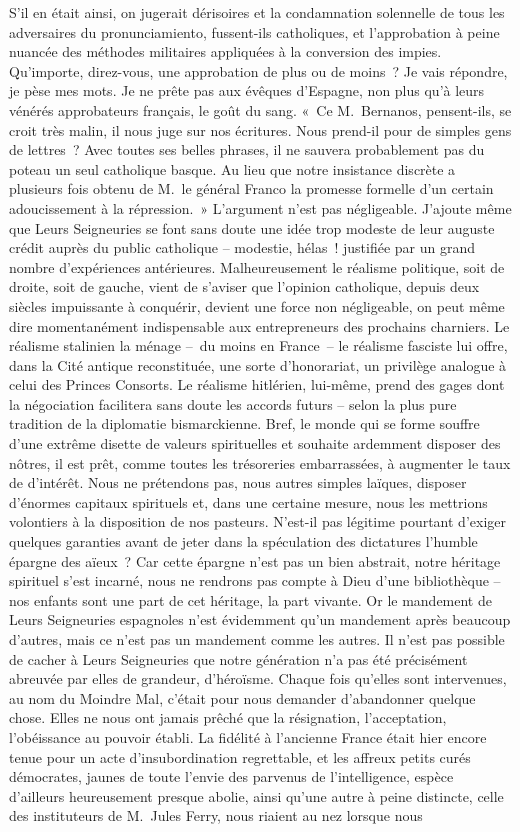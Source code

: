 \documentclass[french,twoside]{book} %
\begin{document}
S’il en était ainsi, on jugerait dérisoires et la condamnation solennelle de tous les adversaires du pronunciamiento, fussent-ils catholiques, et l’approbation à peine nuancée des méthodes militaires appliquées à la conversion des impies. Qu’importe, direz-vous, une approbation de plus ou de moins ? Je vais répondre, je pèse mes mots. Je ne prête pas aux évêques d’Espagne, non plus qu’à leurs vénérés approbateurs français, le goût du sang. « Ce M. Bernanos, pensent-ils, se croit très malin, il nous juge sur nos écritures. Nous prend-il pour de simples gens de lettres ? Avec toutes ses belles phrases, il ne sauvera probablement pas du poteau un seul catholique basque. Au lieu que notre insistance discrète a plusieurs fois obtenu de M. le général Franco la promesse formelle d’un certain adoucissement à la répression. » L’argument n’est pas négligeable. J’ajoute même que Leurs Seigneuries se font sans doute une idée trop modeste de leur auguste crédit auprès du public catholique – modestie, hélas ! justifiée par un grand nombre d’expériences antérieures. Malheureusement le réalisme politique, soit de droite, soit de gauche, vient de s’aviser que l’opinion catholique, depuis deux siècles impuissante à conquérir, devient une force non négligeable, on peut même dire momentanément indispensable aux entrepreneurs des prochains charniers. Le réalisme stalinien la ménage – du moins en France – le réalisme fasciste lui offre, dans la Cité antique reconstituée, une sorte d’honorariat, un privilège analogue à celui des Princes Consorts. Le réalisme hitlérien, lui-même, prend des gages dont la négociation facilitera sans doute les accords futurs – selon la plus pure tradition de la diplomatie bismarckienne. Bref, le monde qui se forme souffre d’une extrême disette de valeurs spirituelles et souhaite ardemment disposer des nôtres, il est prêt, comme toutes les trésoreries embarrassées, à augmenter le taux de d’intérêt. Nous ne prétendons pas, nous autres simples laïques, disposer d’énormes capitaux spirituels et, dans une certaine mesure, nous les mettrions volontiers à la disposition de nos pasteurs. N’est-il pas légitime pourtant d’exiger quelques garanties avant de jeter dans la spéculation des dictatures l’humble épargne des aïeux ? Car cette épargne n’est pas un bien abstrait, notre héritage spirituel s’est incarné, nous ne rendrons pas compte à Dieu d’une bibliothèque – nos enfants sont une part de cet héritage, la part vivante. Or le mandement de Leurs Seigneuries espagnoles n’est évidemment qu’un mandement après beaucoup d’autres, mais ce n’est pas un mandement comme les autres. Il n’est pas possible de cacher à Leurs Seigneuries que notre génération n’a pas été précisément abreuvée par elles de grandeur, d’héroïsme. Chaque fois qu’elles sont intervenues, au nom du Moindre Mal, c’était pour nous demander d’abandonner quelque chose. Elles ne nous ont jamais prêché que la résignation, l’acceptation, l’obéissance au pouvoir établi. La fidélité à l’ancienne France était hier encore tenue pour un acte d’insubordination regrettable, et les affreux petits curés démocrates, jaunes de toute l’envie des parvenus de l’intelligence, espèce d’ailleurs heureusement presque abolie, ainsi qu’une autre à peine distincte, celle des instituteurs de M. Jules Ferry, nous riaient au nez lorsque nous 
\end{document}
